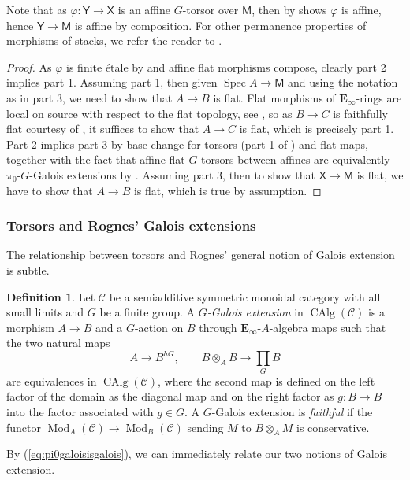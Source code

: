 \documentclass[11pt, a4paper]{article}
\DeclareMathOperator{\Spec}{Spec}
\newcommand{\1}{\mathbf{1}}
\DeclareMathOperator{\CAlg}{CAlg}
\DeclareMathOperator{\Mod}{Mod}
\newcommand{\calC}{\mathcal{C}}
\newcommand{\E}{\mathbf{E}}
\newcommand{\M}{\mathsf{M}}
\newcommand{\X}{\mathsf{X}}
\newcommand{\Y}{\mathsf{Y}}
\theoremstyle{plain}
\theoremstyle{definition}
\newtheorem{mydef}[equation]{Definition}
\theoremstyle{remark}\numberwithin{equation}{section}
\begin{document}
Note that as $\varphi \colon \Y \to \X$ is an affine $G$-torsor over $\M$, then by  shows $\varphi$ is affine, hence $\Y \to \M$ is affine by composition. For other permanence properties of morphisms of stacks, we refer the reader to .

\begin{proof}
    As $\varphi$ is finite étale by  and affine flat morphisms compose, clearly part 2 implies part 1. Assuming part 1, then given $\Spec A \to \M$ and using the notation as in part 3, we need to show that $A \to B$ is flat. Flat morphisms of $\E_\infty$-rings are local on source with respect to the flat topology, see \cite[Lm.B.1.4.2(2)]{sag}, so as $B \to C$ is faithfully flat courtesy of , it suffices to show that $A \to C$ is flat, which is precisely part 1. Part 2 implies part 3 by base change for torsors (part 1 of ) and flat maps, together with the fact that affine flat $G$-torsors between affines are equivalently $\pi_0$-$G$-Galois extensions by . Assuming part 3, then to show that $\X \to \M$ is flat, we have to show that $A \to B$ is flat, which is true by assumption.
\end{proof}

\subsubsection{Torsors and Rognes' Galois extensions}
The relationship between torsors and Rognes' general notion of Galois extension is subtle.

\begin{mydef}\label{def:galois_rognes}
    Let $\calC$ be a semiadditive symmetric monoidal category with all small limits and $G$ be a finite group. A \emph{$G$-Galois extension} in $\CAlg(\calC)$ is a morphism $A \to B$ and a $G$-action on $B$ through $\E_\infty$-$A$-algebra maps such that the two natural maps
    \[A \to B^{hG}, \qquad B\otimes_A B \to \prod_G B\]
    are equivalences in $\CAlg(\calC)$, where the second map is defined on the left factor of the domain as the diagonal map and on the right factor as $g\colon B\to B$ into the factor associated with $g\in G$. A $G$-Galois extension is \emph{faithful} if the functor $\Mod_A(\calC) \to \Mod_B(\calC)$ sending $M$ to $B\otimes_A M$ is conservative.
\end{mydef}

By (\ref{eq:pi0galoisisgalois}), we can immediately relate our two notions of Galois extension.
\end{document}
